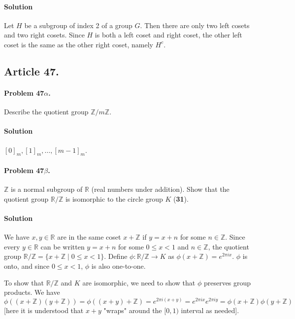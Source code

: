 \paragraph*{Solution}
Let $H$ be a subgroup of index 2 of a group $G$. Then there are only two left
cosets and two right cosets. Since $H$ is both a left coset and right coset,
the other left coset is the same as the other right coset, namely $H^c$.

\subsection{Article 47.}

\paragraph{Problem 47$\alpha$.}
Describe the quotient group $\mathbb{Z} / m\mathbb{Z}$.

\paragraph*{Solution}
$[0]_m, [1]_m, \dots, [m-1]_m$.

\paragraph{Problem 47$\beta$.}
$\mathbb{Z}$ is a normal subgroup of $\mathbb{R}$ (real numbers under addition).
Show that the quotient group $\mathbb{R/Z}$ is isomorphic to the circle group
$K$ (\textbf{31}).

\paragraph*{Solution}
We have $x, y \in \mathbb{R}$ are in the same coset $x + \mathbb{Z}$ if
$y = x + n$ for some $n \in \mathbb{Z}$. Since every $ y \in \mathbb{R} $ can
be written $ y = x + n$ for some $ 0 \leq x < 1 $ and $ n \in \mathbb{Z}$, the
quotient group $\mathbb{R/Z} = \{ x + \mathbb{Z} \mid 0 \leq x < 1 \}$.
Define $\phi : \mathbb{R/Z} \rightarrow K$ as
$\phi (x+\mathbb{Z}) = e^{2\pi i x}$. $\phi$ is onto, and since $ 0 \leq x < 1$,
$\phi$ is also one-to-one.

To show that $\mathbb{R/Z}$ and $K$ are isomorphic, we need to show that $\phi$
preserves group products. We have
$ \phi ((x+\mathbb{Z})(y+\mathbb{Z})) = \phi ((x+y)+\mathbb{Z}) = e^{2\pi i (x+y)}
= e^{2\pi i x}e^{2 \pi i y} = \phi (x+\mathbb{Z}) \phi (y+\mathbb{Z})$ [here it
is understood that $x+y$ "wraps" around the $[0,1)$ interval as needed].

